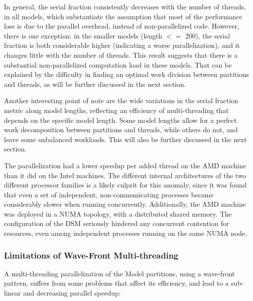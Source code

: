 In general, the serial fraction consistently decreases with the number of threads, in all models, which substantiate the assumption that most of the performance loss is due to the parallel overhead, instead of non-parallelized code. However, there is one exception: in the smaller models (length $<=$ 200), the serial fraction is both considerable higher (indicating a worse parallelization), and it changes little with the number of threads. This result suggests that there is a substantial non-parallelized computation load in these models. That can be explained by the difficulty in finding an optimal work division between partitions and threads, as will be further discussed in the next section.

Another interesting point of note are the wide variations in the serial fraction metric along model lengths, reflecting an efficiency of multi-threading that depends on the specific model length. Some model lengths allow for a perfect work decomposition between partitions and threads, while others do not, and leave some unbalanced workloads. This will also be further discussed in the next section. 

The parallelization had a lower speedup per added thread on the AMD machine than it did on the Intel machines. The different internal architectures of the two different processor families is a likely culprit for this anomaly, since it was found that even a set of independent, non-communicating processes became considerably slower when running concurrently. Additionally, the AMD machine was deployed in a NUMA topology, with a distributed shared memory. The configuration of the DSM seriously hindered any concurrent contention for resources, even among independent processes running on the same NUMA node. 




\subsubsection{Limitations of Wave-Front Multi-threading} 
\label{Limitations of Wave-Front Multi-threading} 

A multi-threading parallelization of the Model partitions, using a wave-front pattern, suffers from some problems that affect its efficiency, and lead to a sub-linear and decreasing parallel speedup:

